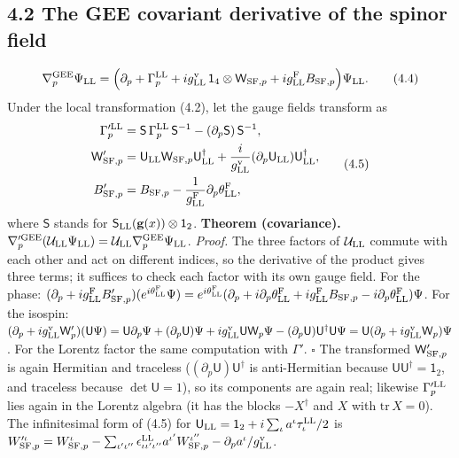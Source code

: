 \documentclass[
  10pt,
]{article}
\begin{document}
\hypertarget{the-gee-covariant-derivative-of-the-spinor-field}{%
\subsection{4.2 The GEE covariant derivative of the spinor
field}\label{the-gee-covariant-derivative-of-the-spinor-field}}

\[\nabla^{\rm GEE}_p\Psi_{\rm LL}=\Big(\partial_p+\Gamma^{\rm LL}_p+ig^{\rm v}_{\rm LL}\,\mathsf 1_4\otimes\mathsf W_{{\rm SF},p}+ig^{\rm F}_{\rm LL}B_{{\rm SF},p}\Big)\Psi_{\rm LL}.\tag{4.4}\]
Under the local transformation (4.2), let the gauge fields transform as
\[\begin{aligned}\Gamma'^{\rm LL}_p&=\mathsf S\,\Gamma^{\rm LL}_p\,\mathsf S^{-1}-(\partial_p\mathsf S)\,\mathsf S^{-1},\\\mathsf W'_{{\rm SF},p}&=\mathsf U_{\rm LL}\mathsf W_{{\rm SF},p}\mathsf U_{\rm LL}^\dagger+\frac i{g^{\rm v}_{\rm LL}}(\partial_p\mathsf U_{\rm LL})\mathsf U_{\rm LL}^\dagger,\\B'_{{\rm SF},p}&=B_{{\rm SF},p}-\frac1{g^{\rm F}_{\rm LL}}\partial_p\theta^{\rm F}_{\rm LL},\end{aligned}\tag{4.5}\]
where \(\mathsf S\) stands for
\(\mathsf S_{\rm LL}(\mathbf g(x))\otimes\mathsf 1_2\). \textbf{Theorem
(covariance).}
\(\nabla'^{\rm GEE}_p(\mathcal U_{\rm LL}\Psi_{\rm LL})=\mathcal U_{\rm LL}\nabla^{\rm GEE}_p\Psi_{\rm LL}\).
\emph{Proof.} The three factors of \(\mathcal U_{\rm LL}\) commute with
each other and act on different indices, so the derivative of the
product gives three terms; it suffices to check each factor with its own
gauge field. For the phase:
\((\partial_p+ig^{\rm F}_{\rm LL}B'_{{\rm SF},p})(e^{i\theta^{\rm F}_{\rm LL}}\Psi)=e^{i\theta^{\rm F}_{\rm LL}}(\partial_p+i\partial_p\theta^{\rm F}_{\rm LL}+ig^{\rm F}_{\rm LL}B_{{\rm SF},p}-i\partial_p\theta^{\rm F}_{\rm LL})\Psi\).
For the isospin:
\((\partial_p+ig^{\rm v}_{\rm LL}\mathsf W'_p)(\mathsf U\Psi)=\mathsf U\partial_p\Psi+(\partial_p\mathsf U)\Psi+ig^{\rm v}_{\rm LL}\mathsf U\mathsf W_p\Psi-(\partial_p\mathsf U)\mathsf U^\dagger\mathsf U\Psi=\mathsf U(\partial_p+ig^{\rm v}_{\rm LL}\mathsf W_p)\Psi\).
For the Lorentz factor the same computation with \(\Gamma'\).
\(\square\) The transformed \(\mathsf W'_{{\rm SF},p}\) is again
Hermitian and traceless (\((\partial_p\mathsf U)\mathsf U^\dagger\) is
anti-Hermitian because \(\mathsf U\mathsf U^\dagger=\mathsf 1_2\), and
traceless because \(\det\mathsf U=1\)), so its components are again
real; likewise \(\Gamma'^{\rm LL}_p\) lies again in the Lorentz algebra
(it has the blocks \(-X^\dagger\) and \(X\) with \(\mathrm{tr}\,X=0\)).
The infinitesimal form of (4.5) for
\(\mathsf U_{\rm LL}=\mathsf 1_2+i\sum_\iota a^\iota\tau^{\rm LL}_\iota/2\)
is
\(W'^\iota_{{\rm SF},p}=W^\iota_{{\rm SF},p}-\sum_{\iota'\iota''}\epsilon^{\rm LL}_{\iota\iota'\iota''}a^{\iota'}W^{\iota''}_{{\rm SF},p}-\partial_pa^\iota/g^{\rm v}_{\rm LL}\).
\end{document}
